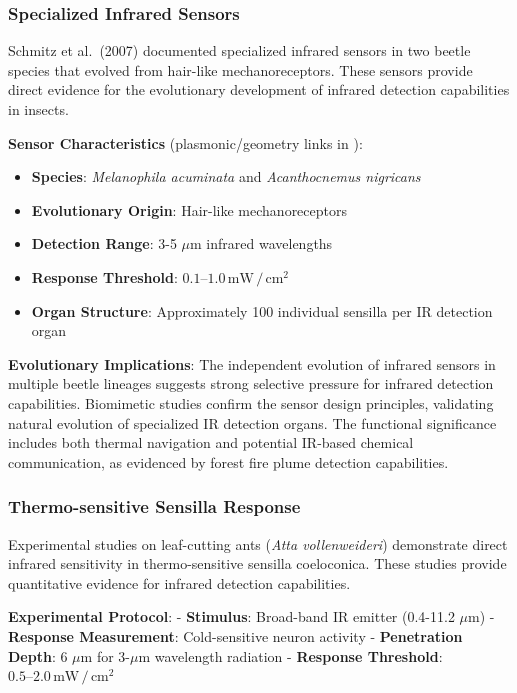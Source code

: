 \documentclass[
  13pt,
  a4paperpaper,
  12pt]{article}
\providecommand{\tightlist}{%
  \setlength{\itemsep}{0pt}\setlength{\parskip}{0pt}}
\begin{document}
\subsubsection{Specialized Infrared
Sensors}\label{specialized-infrared-sensors}

Schmitz et al.~(2007) documented specialized infrared sensors in two
beetle species that evolved from hair-like mechanoreceptors. These
sensors provide direct evidence for the evolutionary development of
infrared detection capabilities in insects.

\textbf{Sensor Characteristics} (plasmonic/geometry links in
):

\begin{itemize}
\tightlist
\item
  \textbf{Species}: \emph{Melanophila acuminata} and \emph{Acanthocnemus
  nigricans}
\item
  \textbf{Evolutionary Origin}: Hair-like mechanoreceptors
\item
  \textbf{Detection Range}: 3-5 \(\mu\mathrm{m}\) infrared wavelengths
\item
  \textbf{Response Threshold}:
  \(0.1\text{--}1.0\,\mathrm{mW}\,/\,\mathrm{cm}^2\)
\item
  \textbf{Organ Structure}: Approximately 100 individual sensilla per IR
  detection organ
\end{itemize}

\textbf{Evolutionary Implications}: The independent evolution of
infrared sensors in multiple beetle lineages suggests strong selective
pressure for infrared detection capabilities. Biomimetic studies confirm
the sensor design principles, validating natural evolution of
specialized IR detection organs. The functional significance includes
both thermal navigation and potential IR-based chemical communication,
as evidenced by forest fire plume detection capabilities.

\subsubsection{Thermo-sensitive Sensilla
Response}\label{thermo-sensitive-sensilla-response}

Experimental studies on leaf-cutting ants (\emph{Atta vollenweideri})
demonstrate direct infrared sensitivity in thermo-sensitive sensilla
coeloconica. These studies provide quantitative evidence for infrared
detection capabilities.

\textbf{Experimental Protocol}: - \textbf{Stimulus}: Broad-band IR
emitter (0.4-11.2 \(\mu\mathrm{m}\)) - \textbf{Response Measurement}:
Cold-sensitive neuron activity - \textbf{Penetration Depth}: 6
\(\mu\mathrm{m}\) for 3-\(\mu\mathrm{m}\) wavelength radiation -
\textbf{Response Threshold}:
\(0.5\text{--}2.0\,\mathrm{mW}\,/\,\mathrm{cm}^2\)
\end{document}
